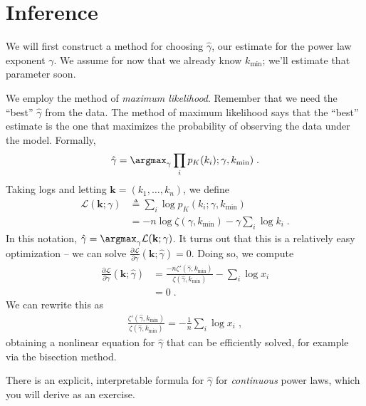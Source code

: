 \documentclass[english]{scrartcl}
\begin{document}
\section*{Inference}
	We will first construct a method for choosing $\hat{\gamma}$, our estimate for the power law exponent $\gamma$. We assume for now that we already know $k_{\text{min}}$; we'll estimate that parameter soon. 

	We employ the method of \emph{maximum likelihood}. Remember that we need the ``best'' $\hat{\gamma}$ from the data. The method of maximum likelihood says that the ``best'' estimate is the one that maximizes the probability of observing the data under the model. Formally, 
	\begin{align}
		\hat{\gamma} = \argmax_\gamma \prod_i p_K(k_i);\gamma, k_{\text{min}})\;.
	\end{align}
	Taking logs and letting $\mathbf{k} = (k_1,\ldots,k_n)$, we define
	\begin{align}
		\mathcal{L(\mathbf{k}; \gamma)} &\triangleq \sum_i \log p_K(k_i; \gamma, k_{\text{min}}) \\ 
		&= -n \log \zeta(\gamma, k_{\text{min}}) - \gamma \sum_{i} \log k_i\;.
	\end{align}
	In this notation, $\hat{\gamma} = \argmax_{\gamma} \mathcal{L(\mathbf{k}; \gamma)}$. It turns out that this is a relatively easy optimization -- we can solve $\frac{\partial \mathcal{L}}{\partial \gamma}(\mathbf{k}; \hat{\gamma}) = 0$. Doing so, we compute 
	\begin{align}
		\frac{\partial \mathcal{L}}{\partial \gamma}(\mathbf{k}; \hat{\gamma}) &= \frac{-n\zeta'(\hat{\gamma}, k_{\text{min}})}{\zeta(\hat{\gamma}, k_{\text{min}})} - \sum_{i}\log x_i \\ 
		&= 0\;.
	\end{align}
	We can rewrite this as
	\begin{align}
		\frac{\zeta'(\hat{\gamma}, k_\text{min})}{\zeta(\hat{\gamma}, k_\text{min})} = -\frac{1}{n} \sum_i \log x_i\;, \label{eq:numerical}
	\end{align}
	obtaining a nonlinear equation for $\hat{\gamma}$ that can be efficiently solved, for example via the bisection method. 

	There is an explicit, interpretable formula for $\hat{\gamma}$ for \emph{continuous} power laws, which you will derive as an exercise. 
	 
\end{document}
